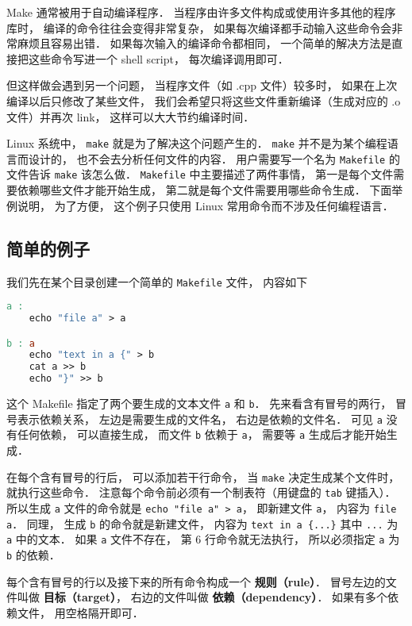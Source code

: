 
Make 通常被用于自动编译程序． 当程序由许多文件构成或使用许多其他的程序库时， 编译的命令往往会变得非常复杂， 如果每次编译都手动输入这些命令会非常麻烦且容易出错． 如果每次输入的编译命令都相同， 一个简单的解决方法是直接把这些命令写进一个 shell script， 每次编译调用即可．

但这样做会遇到另一个问题， 当程序文件（如 .cpp 文件）较多时， 如果在上次编译以后只修改了某些文件， 我们会希望只将这些文件重新编译（生成对应的 .o 文件）并再次 link， 这样可以大大节约编译时间．

Linux 系统中， \verb|make| 就是为了解决这个问题产生的． \verb|make| 并不是为某个编程语言而设计的， 也不会去分析任何文件的内容． 用户需要写一个名为 \verb|Makefile| 的文件告诉 \verb|make| 该怎么做． \verb|Makefile| 中主要描述了两件事情， 第一是每个文件需要依赖哪些文件才能开始生成， 第二就是每个文件需要用哪些命令生成． 下面举例说明， 为了方便， 这个例子只使用 Linux 常用命令而不涉及任何编程语言．


\subsection{简单的例子}
我们先在某个目录创建一个简单的 \verb|Makefile| 文件， 内容如下
\begin{lstlisting}[language=makefile, caption=Makefile]
a :
	echo "file a" > a

b : a
	echo "text in a {" > b
	cat a >> b
	echo "}" >> b
\end{lstlisting}
这个 Makefile 指定了两个要生成的文本文件 \verb|a| 和 \verb|b|． 先来看含有冒号的两行， 冒号表示依赖关系， 左边是需要生成的文件名， 右边是依赖的文件名． 可见 \verb|a| 没有任何依赖， 可以直接生成， 而文件 \verb|b| 依赖于 \verb|a|， 需要等 \verb|a| 生成后才能开始生成．

在每个含有冒号的行后， 可以添加若干行命令， 当 \verb|make| 决定生成某个文件时， 就执行这些命令． 注意每个命令前必须有一个制表符（用键盘的 \verb|tab| 键插入）． 所以生成 \verb|a| 文件的命令就是 \verb|echo "file a" > a|， 即新建文件 \verb|a|， 内容为 \verb|file a|． 同理， 生成 \verb|b| 的命令就是新建文件， 内容为 \verb|text in a {...}| 其中 \verb|...| 为 \verb|a| 中的文本． 如果 \verb|a| 文件不存在， 第 6 行命令就无法执行， 所以必须指定 \verb|a| 为 \verb|b| 的依赖．

每个含有冒号的行以及接下来的所有命令构成一个 \textbf{规则（rule）}． 冒号左边的文件叫做 \textbf{目标（target）}， 右边的文件叫做 \textbf{依赖（dependency）}． 如果有多个依赖文件， 用空格隔开即可．

